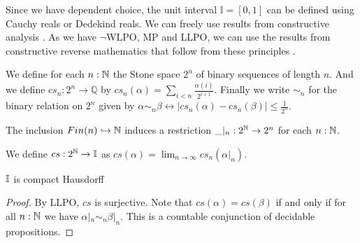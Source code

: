 Since we have dependent choice, the unit interval $\mathbb I = [0,1]$ can be defined using 
Cauchy reals or Dedekind reals. 
We can freely use results from constructive analysis \cite{Bishop}. 
As we have $\neg$WLPO, MP and LLPO, we can use the results from 
constructive reverse mathematics that follow from these principles \cite{ReverseMathsBishop, HannesDiener}. 
\begin{definition}
  \label{def-cs-Interval}
  We define for each $n:\mathbb{N}$ the Stone space $2^n$ of binary sequences of length $n$.
  And we define $cs_n:2^n \to \mathbb Q$ by 
  $cs_n(\alpha) = \sum_{i < n } \frac{\alpha(i)}{2^{i+1}}.$
  Finally we write $\sim_n$ for the binary relation on $2^n$ given by 
  $\alpha\sim_n \beta 
  \leftrightarrow \left|cs_n(\alpha) - cs_n(\beta)\right|\leq\frac{1}{2^n}$.
\end{definition}
\begin{remark}
  The inclusion $Fin(n) \hookrightarrow \mathbb{N}$ induces a restriction 
  $\_|_n : 2^{\mathbb{N}} \to 2^n$ for each $n:\mathbb{N}$. 
\end{remark}
\begin{definition}
  We define $cs:2^{\mathbb{N}} \to \mathbb{I}$ as 
  $cs(\alpha) = \lim_{n\to\infty} cs_n(\alpha|_n)$. 
\end{definition}

\begin{theorem}\label{IntervalIsCHaus}
  $\mathbb{I}$ is compact Hausdorff
\end{theorem}
\begin{proof}
  By LLPO, $cs$ is surjective.   
  Note that $cs(\alpha) = cs(\beta)$ if and only if 
  for all $n:\mathbb{N}$ we have $\alpha|_n \sim_n \beta|_n$. 
  This is a countable conjunction of decidable propositions.
\end{proof}

